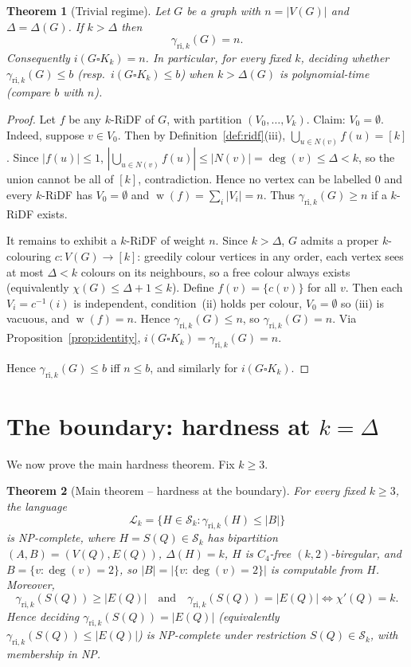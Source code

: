 \documentclass[11pt,a4paper]{article}
\theoremstyle{plain}
\newtheorem{theorem}{Theorem}[section]
\theoremstyle{definition}
\DeclareMathOperator{\weight}{w}
\newcommand{\gri}{\gamma_{\mathrm{ri},k}}
\newcommand{\cardK}{\square K_k}
\newcommand{\setK}{[k]}
\newcommand{\cS}{\mathcal{S}}
\newcommand{\cL}{\mathcal{L}}
\begin{document}
\begin{theorem}[Trivial regime]\label{thm:trivial}
Let $G$ be a graph with $n=|V(G)|$ and $\Delta=\Delta(G)$. If $k>\Delta$ then
\[
\gri(G)=n.
\]
Consequently $i(G\cardK)=n$. In particular, for every fixed $k$, deciding whether $\gri(G)\le b$ (resp.\ $i(G\cardK)\le b$) when $k>\Delta(G)$ is polynomial-time (compare $b$ with $n$).
\end{theorem}
\begin{proof}
Let $f$ be any $k$-RiDF of $G$, with partition $(V_{0},\dots,V_{k})$.
Claim: $V_{0}=\emptyset$. Indeed, suppose $v\in V_{0}$.
Then by Definition~\ref{def:ridf}(iii), $\bigcup_{u\in N(v)}f(u)=\setK$.
Since $|f(u)|\le 1$, $|\bigcup_{u\in N(v)}f(u)|\le |N(v)|=\deg(v)\le\Delta<k$,
so the union cannot be all of $\setK$, contradiction. Hence no vertex can be labelled $0$ and every $k$-RiDF has $V_{0}=\emptyset$ and $\weight(f)=\sum_{i}|V_{i}|=n$. Thus $\gri(G)\ge n$ if a $k$-RiDF exists.

It remains to exhibit a $k$-RiDF of weight $n$.
Since $k>\Delta$, $G$ admits a proper $k$-colouring $c\colon V(G)\to\setK$:
greedily colour vertices in any order, each vertex sees at most $\Delta<k$ colours on its neighbours, so a free colour always exists (equivalently $\chi(G)\le\Delta+1\le k$).
Define $f(v)=\{c(v)\}$ for all $v$. Then each $V_{i}=c^{-1}(i)$ is independent, condition~(ii) holds per colour, $V_{0}=\emptyset$ so (iii) is vacuous, and $\weight(f)=n$. Hence $\gri(G)\le n$, so $\gri(G)=n$.
Via Proposition~\ref{prop:identity}, $i(G\cardK)=\gri(G)=n$.

Hence $\gri(G)\le b$ iff $n\le b$, and similarly for $i(G\cardK)$.
\end{proof}

\section{The boundary: hardness at \texorpdfstring{$k=\Delta$}{k = Delta}}\label{sec:boundary}

We now prove the main hardness theorem. Fix $k\ge 3$.

\begin{theorem}[Main theorem -- hardness at the boundary]\label{thm:main}
For every fixed $k\ge 3$, the language
\[
\cL_{k}=\{H\in\cS_{k}:\gri(H)\le |B|\}
\]
is NP-complete, where $H=S(Q)\in\cS_{k}$ has bipartition $(A,B)=(V(Q),E(Q))$, $\Delta(H)=k$, $H$ is $C_{4}$-free $(k,2)$-biregular, and $B=\{v:\deg(v)=2\}$, so $|B|=|\{v:\deg(v)=2\}|$ is computable from $H$.
Moreover,
\[
\gri(S(Q))\ge |E(Q)|\quad\text{and}\quad \gri(S(Q))=|E(Q)|\iff \chi'(Q)=k.
\]
Hence deciding $\gri(S(Q))=|E(Q)|$ (equivalently $\gri(S(Q))\le|E(Q)|$) is NP-complete under restriction $S(Q)\in\cS_{k}$, with membership in NP.
\end{theorem}
\end{document}
